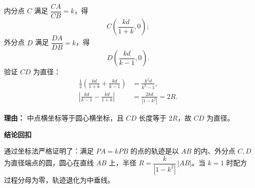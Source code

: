 \begin{proofbox}
\begin{description}[style=nextline, leftmargin=2.8em, labelsep=0.5em, itemsep=0.55em]
		\item[\textbf{步骤六（验证直径）：}]
		      内分点 $C$ 满足 $\dfrac{CA}{CB}=k$，得
		      \[
			      C\left(\frac{kd}{1+k},0\right);
		      \]
		      外分点 $D$ 满足 $\dfrac{DA}{DB}=k$，得
		      \[
			      D\left(\frac{kd}{k-1},0\right).
		      \]
		      验证 $CD$ 为直径：
		      \[
			      \begin{aligned}
				      \frac{1}{2}\left(\frac{kd}{1+k}+\frac{kd}{k-1}\right) & =\frac{k^{2}d}{k^{2}-1},   \\
				      \left|\frac{kd}{k-1}-\frac{kd}{1+k}\right|            & =\frac{2kd}{|1-k^{2}|}=2R.
			      \end{aligned}
		      \]
		      \par\textbf{理由：} 中点横坐标等于圆心横坐标，且 $CD$ 长度等于 $2R$，故 $CD$ 为直径。
	\end{description}

	\medskip
	\textbf{\textcolor{CProof}{结论回扣}}

	通过坐标法严格证明了：满足 $PA=kPB$ 的点的轨迹是以 $AB$ 的内、外分点 $C,D$ 为直径端点的圆，圆心在直线 $AB$ 上，半径 $R=\dfrac{k}{|1-k^{2}|}\,|AB|$。当 $k=1$ 时配方过程分母为零，轨迹退化为中垂线。
\end{proofbox}